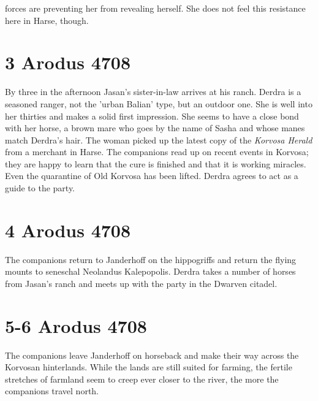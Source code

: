 forces are preventing her from revealing herself. She does not feel this resistance here in Harse, though.\\

\section{3 Arodus 4708}

By three in the afternoon Jasan's sister-in-law arrives at his ranch. Derdra is a seasoned ranger, not the 'urban Balian' type, but an outdoor one. She is well into her thirties and makes a solid first impression. She seems to have a close bond with her horse, a brown mare who goes by the name of Sasha and whose manes match Derdra's hair. The woman picked up the latest copy of the {\itshape Korvosa Herald} from a merchant in Harse. The companions read up on recent events in Korvosa; they are happy to learn that the cure is finished and that it is working miracles. Even the quarantine of Old Korvosa has been lifted. Derdra agrees to act as a guide to the party. \section{4 Arodus 4708}

The companions return to Janderhoff on the hippogriffs and return the flying mounts to seneschal Neolandus Kalepopolis. Derdra takes a number of horses from Jasan's ranch and meets up with the party in the Dwarven citadel.\\

\section{5-6 Arodus 4708}

The companions leave Janderhoff on horseback and make their way across the Korvosan hinterlands. While the lands are still suited for farming, the fertile stretches of farmland seem to creep ever closer to the river, the more the companions travel north.\\

